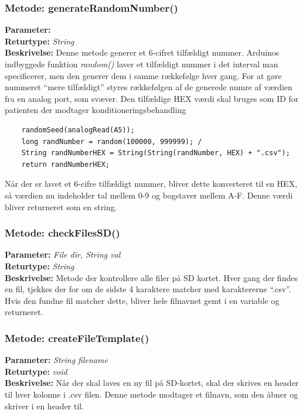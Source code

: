 \subsubsection{Metode: generateRandomNumber()} \label{title:RandomNumber}
\textbf{Parameter: } 
\\ \textbf{Returtype: } \textit{String}
\\ \textbf{Beskrivelse: }  Denne metode generer et 6-cifret tilfældigt nummer. Arduinos indbyggede funktion \textit{random()} laver et tilfældigt nummer i det interval man specificerer, men den generer dem i samme rækkefølge hver gang. For at gøre nummeret “mere tilfældigt” styres rækkefølgen af de generede numre af værdien fra en analog port, som svæver. Den tilfældige HEX værdi skal bruges som ID for patienten der modtager konditioneringsbehandling 
\begin{lstlisting}
	randomSeed(analogRead(A5)); 
	long randNumber = random(100000, 999999); /
	String randNumberHEX = String(String(randNumber, HEX) +	".csv");
	return randNumberHEX; 
\end{lstlisting}
Når der er lavet et 6-cifre tilfældigt nummer, bliver dette konverteret til en HEX, så værdien nu indeholder tal mellem 0-9 og bogstaver mellem A-F. Denne værdi bliver returneret som en string. 

\subsubsection{Metode: checkFilesSD()} \label{title:checkFiles}
\textbf{Parameter: } \textit{File dir, String val}
\\ \textbf{Returtype: } \textit{String}
\\ \textbf{Beskrivelse: }  Metode der kontrollere alle filer på SD kortet. Hver gang der findes en fil, tjekkes der for om de sidste 4 karaktere matcher med karaktererne “.csv”. Hvis den fundne fil matcher dette, bliver hele filnavnet gemt i en variable og returneret. 


\subsubsection{Metode: createFileTemplate()} \label{title:createTemplate}
\textbf{Parameter: } \textit{String filename}
\\ \textbf{Returtype: } \textit{void}
\\ \textbf{Beskrivelse: }  Når der skal laves en ny fil på SD-kortet, skal der skrives en header til hver kolonne i .csv filen. Denne metode modtager et filnavn, som den åbner og skriver i en header til. 

